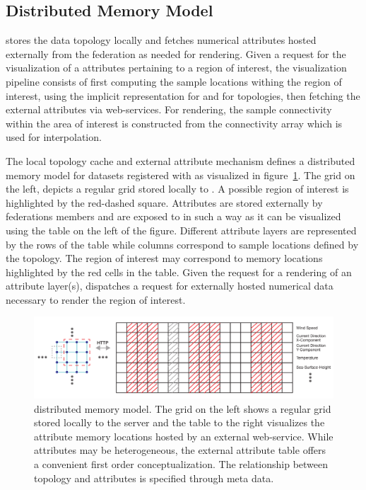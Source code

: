 \subsection{Distributed Memory Model}
\sciwms{} stores the data topology locally and fetches numerical
attributes hosted externally from the federation as needed for
rendering. Given a request for the visualization of a attributes
pertaining to a region of interest, the visualization pipeline
consists of first computing the sample locations withing the region of
interest, using the implicit representation for \cgrid{} and \rtree{}
for \ugrid{} topologies, then fetching the external attributes via
\ogc{} web-services. For rendering, the sample connectivity within the
area of interest is constructed from the connectivity array which is
used for interpolation.

The local topology cache and external attribute mechanism defines a
distributed memory model for datasets registered with \sciwms{} as
visualized in figure~\ref{fig:sciwms_mem_model}. The grid on the left,
depicts a regular grid stored locally to \sciwms{}. A possible region
of interest is highlighted by the red-dashed square. Attributes are
stored externally by federations members and are exposed to \sciwms{}
in such a way as it can be visualized using the table on the left of
the figure. Different attribute layers are represented by the rows of
the table while columns correspond to sample locations defined by the
topology. The region of interest may correspond to memory locations
highlighted by the red cells in the table. Given the request for a
rendering of an attribute layer(s), \sciwms{} dispatches a request for
externally hosted numerical data necessary to render the region of
interest.

\begin{figure}[ht!]
  \centering
  \includegraphics[width=\textwidth]{../figs/topology_memModel}
  \caption{\sciwms{} distributed memory model. The grid on the left
    shows a regular grid stored locally to the \sciwms{} server and
    the table to the right visualizes the attribute memory locations
    hosted by an external web-service. While attributes may be
    heterogeneous, the external attribute table offers a convenient
    first order conceptualization. The relationship between topology
    and attributes is specified through \ncml{} meta data.}
  \label{fig:sciwms_mem_model}
\end{figure}
